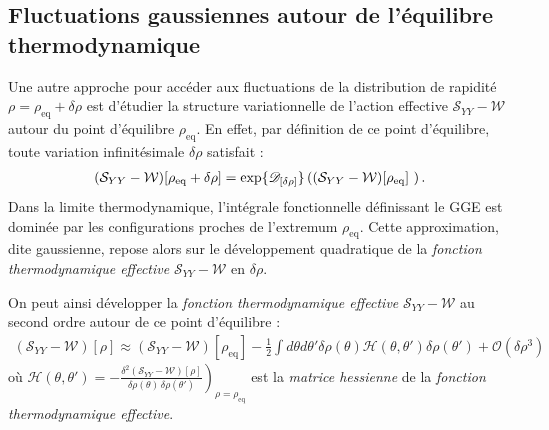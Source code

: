 \subsection{Fluctuations gaussiennes autour de l’équilibre thermodynamique}

Une autre approche pour accéder aux fluctuations de la distribution de rapidité $\rho = \rho_{\mathrm{eq}} + \delta \rho $  est d'étudier la structure variationnelle de l’action effective $\mathcal{S}_{YY} - \mathcal{W}$ autour du point d’équilibre $\rho_{\mathrm{eq}}$. En effet, par définition de ce point d’équilibre, toute variation infinitésimale $\delta \rho$ satisfait  \cite{Wheeler_FieldTheory_Ch5}:
\begin{eqnarray*}
	(\mathcal{S}_{YY} - \mathcal{W})[\rho_{\mathrm{eq}} + \delta \rho ]  = \exp \{\dfonc{\delta \rho }\}\left ( (\mathcal{S}_{YY} - \mathcal{W})[\rho_{\mathrm{eq}}] \right ).
\end{eqnarray*}
Dans la limite thermodynamique, l’intégrale fonctionnelle définissant le \gls{GGE} est dominée par les configurations proches de l'extremum $\rho_{\mathrm{eq}}$. Cette approximation, dite gaussienne, repose alors sur le développement quadratique de la {\em fonction thermodynamique effective} $\mathcal{S}_{YY} - \mathcal{W}$ en $\delta \rho$.

\smallskip

On peut ainsi développer la {\em fonction thermodynamique effective} $\mathcal{S}_{YY} - \mathcal{W}$  au second ordre autour de ce point d'équilibre :
\begin{eqnarray}
	(\mathcal{S}_{YY} - \mathcal{W})[\rho] \approx (\mathcal{S}_{YY} - \mathcal{W})[\rho_{\mathrm{eq}}]   - \frac{1}{2} \int d\theta d \theta' \delta \rho(\theta) \mathcal{H}(\theta, \theta' )\delta \rho(\theta') + \mathcal{O}(\delta \rho^3)
\end{eqnarray}
où
\(
\displaystyle \mathcal{H}(\theta, \theta' ) = -\left.\frac{\delta^{2}(\mathcal{S}_{YY}-\mathcal{W})[\rho]}{\delta\rho(\theta)\,\delta\rho(\theta')}\right)_{\rho = \rho_{\mathrm{eq}}}
\)
est la \emph{matrice hessienne} de la {\em fonction thermodynamique effective}.

